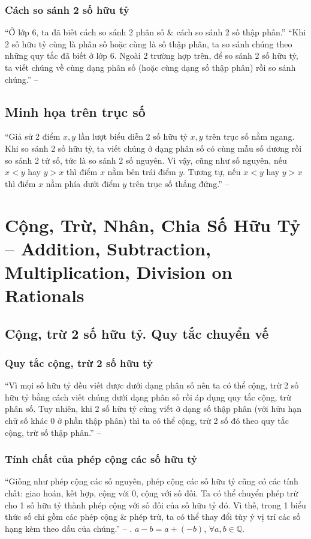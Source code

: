 \documentclass[oneside]{book}
\numberwithin{equation}{section}
\begin{document}
\subsubsection{Cách so sánh 2 số hữu tỷ}
``Ở lớp 6, ta đã biết cách so sánh 2 phân số \& cách so sánh 2 số thập phân.'' ``Khi 2 số hữu tỷ cùng là phân số hoặc cùng là số thập phân, ta so sánh chúng theo những quy tắc đã biết ở lớp 6. Ngoài 2 trường hợp trên, để so sánh 2 số hữu tỷ, ta viết chúng về cùng dạng phân số (hoặc cùng dạng số thập phân) rồi so sánh chúng.'' -- \cite[p. 9]{SGK_Toan_7_Canh_Dieu_tap_1}

\subsection{Minh họa trên trục số}
``Giả sử 2 điểm $x,y$ lần lượt biểu diễn 2 số hữu tỷ $x,y$ trên trục số nằm ngang. Khi so sánh 2 số hữu tỷ, ta viết chúng ở dạng phân số có cùng mẫu số dương rồi so sánh 2 tử số, tức là so sánh 2 số nguyên. Vì vậy, cũng như số nguyên, nếu $x < y$ hay $y > x$ thì điểm $x$ nằm bên trái điểm $y$. Tương tự, nếu $x < y$ hay $y > x$ thì điểm $x$ nằm phía dưới điểm $y$ trên trục số thẳng đứng.'' -- \cite[pp. 9--10]{SGK_Toan_7_Canh_Dieu_tap_1}

\section{Cộng, Trừ, Nhân, Chia Số Hữu Tỷ -- Addition, Subtraction, Multiplication, Division on Rationals}

\subsection{Cộng, trừ 2 số hữu tỷ. Quy tắc chuyển vế}

\subsubsection{Quy tắc cộng, trừ 2 số hữu tỷ}
``Vì mọi số hữu tỷ đều viết được dưới dạng phân số nên ta có thể cộng, trừ 2 số hữu tỷ bằng cách viết chúng dưới dạng phân số rồi áp dụng quy tắc cộng, trừ phân số. Tuy nhiên, khi 2 số hữu tỷ cùng viết ở dạng số thập phân (với hữu hạn chữ số khác $0$ ở phần thập phân) thì ta có thể cộng, trừ 2 số đó theo quy tắc cộng, trừ số thập phân.'' -- \cite[p. 12]{SGK_Toan_7_Canh_Dieu_tap_1}

\subsubsection{Tính chất của phép cộng các số hữu tỷ}
``Giống như phép cộng các số nguyên, phép cộng các số hữu tỷ cũng có các tính chất: giao hoán, kết hợp, cộng với $0$, cộng với số đối. Ta có thể chuyển phép trừ cho 1 số hữu tỷ thành phép cộng với số đối của số hữu tỷ đó. Vì thế, trong 1 biểu thức số chỉ gồm các phép cộng \& phép trừ, ta có thể thay đổi tùy ý vị trí các số hạng kèm theo dấu của chúng.'' -- \cite[p. 13]{SGK_Toan_7_Canh_Dieu_tap_1}. $a - b = a + (-b)$, $\forall a,b\in\mathbb{Q}$.
\end{document}

